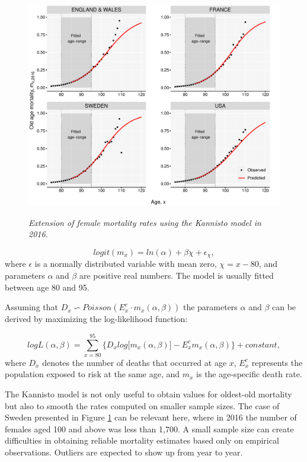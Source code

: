 \documentclass[risks,article,submit,moreauthors,pdftex]{Definitions/mdpi}
\begin{document}
\begin{figure}[!h]

{\centering \includegraphics[width=0.9\linewidth]{Figure8-1}}

\caption{\textit{Extension of female mortality rates using the Kannisto model in 2016.}}\label{fig:Figure8}
\end{figure}

\begin{equation}
\label{eq:kannisto2}
  logit(m_x) = ln(\alpha) + \beta \chi + \epsilon_{\chi},
\end{equation}
where $\epsilon$ is a normally distributed variable with mean zero, $\chi = x - 80$, and parameters $\alpha$ and $\beta$ are positive real numbers. The model is usually fitted between age 80 and 95.

Assuming that $D_x \backsim Poisson(E_{x}^{c} \cdot m_x (\alpha , \beta))$ the parameters $\alpha$ and $\beta$ can be derived by maximizing the log-likelihood function:

\begin{equation}
\label{eq:kannistoL}
  log L(\alpha , \beta) = \sum_{x=80}^{95} \Big\{
  D_x log \big[m_x(\alpha , \beta) \big] - 
  E_{x}^{c} m_x(\alpha , \beta) \Big\} + constant,
\end{equation}
where $D_x$ denotes the number of deaths that occurred at age $x$, $E_{x}^{c}$ represents the population exposed to risk at the same age, and $m_x$ is the age-specific death rate.

The Kannisto model is not only useful to obtain values for oldest-old mortality but also to smooth the rates computed on smaller sample sizes. The case of Sweden presented in Figure \ref{fig:Figure8} can be relevant here, where in 2016 the number of females aged 100 and above was less than 1,700. A small sample size  can create difficulties in obtaining reliable mortality estimates based only on empirical observations. Outliers are expected to show up  from year to year. 
\end{document}
